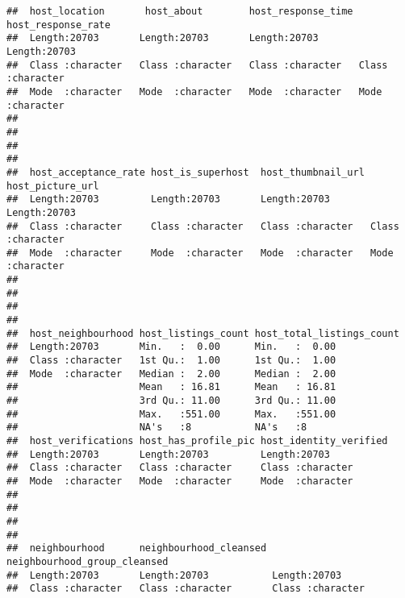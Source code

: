 \begin{verbatim}
##  host_location       host_about        host_response_time host_response_rate
##  Length:20703       Length:20703       Length:20703       Length:20703      
##  Class :character   Class :character   Class :character   Class :character  
##  Mode  :character   Mode  :character   Mode  :character   Mode  :character  
##                                                                             
##                                                                             
##                                                                             
##                                                                             
##  host_acceptance_rate host_is_superhost  host_thumbnail_url host_picture_url  
##  Length:20703         Length:20703       Length:20703       Length:20703      
##  Class :character     Class :character   Class :character   Class :character  
##  Mode  :character     Mode  :character   Mode  :character   Mode  :character  
##                                                                               
##                                                                               
##                                                                               
##                                                                               
##  host_neighbourhood host_listings_count host_total_listings_count
##  Length:20703       Min.   :  0.00      Min.   :  0.00           
##  Class :character   1st Qu.:  1.00      1st Qu.:  1.00           
##  Mode  :character   Median :  2.00      Median :  2.00           
##                     Mean   : 16.81      Mean   : 16.81           
##                     3rd Qu.: 11.00      3rd Qu.: 11.00           
##                     Max.   :551.00      Max.   :551.00           
##                     NA's   :8           NA's   :8                
##  host_verifications host_has_profile_pic host_identity_verified
##  Length:20703       Length:20703         Length:20703          
##  Class :character   Class :character     Class :character      
##  Mode  :character   Mode  :character     Mode  :character      
##                                                                
##                                                                
##                                                                
##                                                                
##  neighbourhood      neighbourhood_cleansed neighbourhood_group_cleansed
##  Length:20703       Length:20703           Length:20703                
##  Class :character   Class :character       Class :character            

\end{verbatim}
